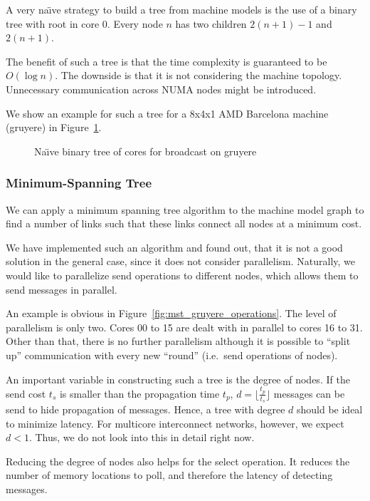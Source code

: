 \documentclass{article}
\newcommand{\naive}{na\"{\i}ve\xspace}
\newcommand{\Naive}{Na\"{\i}ve\xspace}
\begin{document}
A very \naive strategy to build a tree from machine models is the use
of a binary tree with root in core 0. Every node $n$ has two children
$2(n+1)-1$ and $2(n+1)$.

The benefit of such a tree is that the time complexity is guaranteed
to be $O(\log{n})$. The downside is that it is not considering the
machine topology. Unnecessary communication across NUMA nodes might be
introduced. 

We show an example for such a tree for a 8x4x1 AMD Barcelona machine
(gruyere) in Figure~\ref{fig:qrm_tree_gruyere}.

\begin{figure}
  
  \caption{\Naive binary tree of cores for broadcast on gruyere}
  \label{fig:qrm_tree_gruyere}
\end{figure}

\subsubsection{Minimum-Spanning Tree}
\label{sec:mst_tree}

We can apply a minimum spanning tree algorithm to the machine model
graph to find a number of links such that these links connect all
nodes at a minimum cost.

We have implemented such an algorithm and found out, that it is not a
good solution in the general case, since it does not consider
parallelism. Naturally, we would like to parallelize send operations
to different nodes, which allows them to send messages in parallel. 

An example is obvious in Figure~\ref{fig:mst_gruyere_operations}. The
level of parallelism is only two. Cores 00 to 15 are dealt with in
parallel to cores 16 to 31. Other than that, there is no further
parallelism although it is possible to ``split up'' communication with
every new ``round'' (i.e.\ send operations of nodes).

An important variable in constructing such a tree is the degree of
nodes. If the send cost $t_s$ is smaller than the propagation time
$t_p$, $d = \lfloor \frac{t_p}{t_s} \rfloor$ messages can be send to
hide propagation of messages. Hence, a tree with degree $d$ should be
ideal to minimize latency. For multicore interconnect networks,
however, we expect $d<1$. Thus, we do not look into this in detail
right now.

Reducing the degree of nodes also helps for the select operation. It
reduces the number of memory locations to poll, and therefore the
latency of detecting messages.
\end{document}
